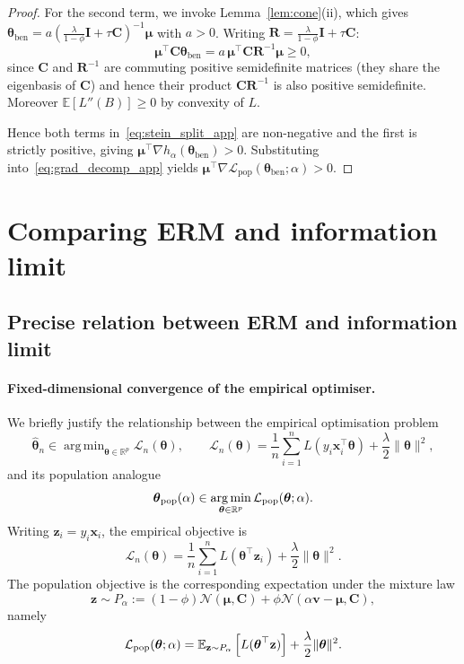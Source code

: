 \documentclass[11pt]{article}
\DeclareMathOperator*{\argmin}{arg\,min}
\newcommand{\RR}{\mathbb{R}}
\newcommand{\EE}{\mathbb{E}}
\newcommand{\NN}{\mathcal{N}}
\newcommand{\I}{\mathbf{I}}
\newcommand{\C}{\mathbf{C}}
\newcommand{\x}{\mathbf{x}}
\newcommand{\bv}{\mathbf{v}}
\newcommand{\bmu}{\boldsymbol{\mu}}
\newcommand{\btheta}{\boldsymbol{\theta}}
\begin{document}
\begin{proof}
For the second term, we invoke Lemma~\ref{lem:cone}(ii), which gives
$\btheta_{\mathrm{ben}} = a(\tfrac{\lambda}{1-\phi}\I+\tau\C)^{-1}\bmu$ with
$a > 0$.
Writing $\mathbf{R} = \tfrac{\lambda}{1-\phi}\I+\tau\C$:
\[
\bmu^\top\C\btheta_{\mathrm{ben}}
= a\,\bmu^\top\C\mathbf{R}^{-1}\bmu \geq 0,
\]
since $\C$ and $\mathbf{R}^{-1}$ are commuting positive semidefinite
matrices (they share the eigenbasis of $\C$) and hence their product
$\C\mathbf{R}^{-1}$ is also positive semidefinite.
Moreover $\EE[L''(B)] \geq 0$ by convexity of $L$.

Hence both terms in~\eqref{eq:stein_split_app} are non-negative and
the first is strictly positive,
giving $\bmu^\top\nabla h_\alpha(\btheta_{\mathrm{ben}}) > 0$.
Substituting into~\eqref{eq:grad_decomp_app} yields
$\bmu^\top\nabla\mathcal{L}_{\mathrm{pop}}
(\btheta_{\mathrm{ben}};\alpha) > 0$.
\end{proof}


\newpage
\section{Comparing ERM and information limit}

\subsection{Precise relation between ERM and information limit}
\label{app:erm_pop_bound}

\paragraph{Fixed-dimensional convergence of the empirical optimiser.}
We briefly justify the relationship between the empirical optimisation problem
\[
\widehat{\btheta}_{n}
\in
\argmin_{\btheta\in\RR^p}
\mathcal L_n(\btheta),
\qquad
\mathcal L_n(\btheta)
=
\frac1n\sum_{i=1}^n L(y_i\x_i^\top\btheta)
+
\frac{\lambda}{2}\|\btheta\|^2,
\]
and its population analogue
\[
\btheta_{\rm pop}(\alpha)
\in
\argmin_{\btheta\in\RR^p}
\mathcal L_{\rm pop}(\btheta;\alpha).
\]
Writing \(\mathbf{z}_i=y_i\x_i\), the empirical objective is
\[
\mathcal L_n(\btheta)
=
\frac1n\sum_{i=1}^n L(\btheta^\top \mathbf{z}_i)
+
\frac{\lambda}{2}\|\btheta\|^2.
\]
The population objective is the corresponding expectation under the mixture law
\[
\mathbf{z} \sim P_\alpha
:=
(1-\phi)\NN(\bmu,\C)
+
\phi\NN(\alpha\bv-\bmu,\C),
\]
namely
\[
\mathcal L_{\rm pop}(\btheta;\alpha)
=
\EE_{\mathbf{z}\sim P_\alpha}
\left[
L(\btheta^\top \mathbf{z})
\right]
+
\frac{\lambda}{2}\|\btheta\|^2.
\]
\end{document}

